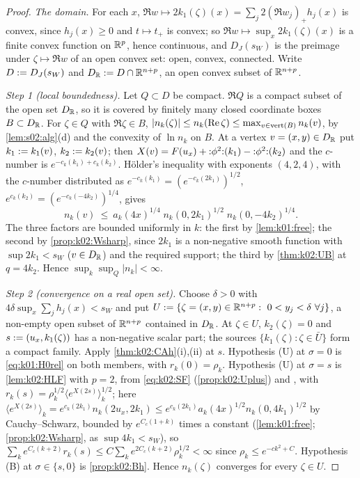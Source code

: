 \begin{proof}
\emph{The domain.} For each $x$, $\Re w\mapsto2k_1(\zeta)(x)=\sum_j2(\Re w_j)_+h_j(x)$ is convex, since $h_j(x)\ge0$ and $t\mapsto t_+$ is convex; so $\Re w\mapsto\sup_x2k_1(\zeta)(x)$ is a finite convex function on $\mathbb R^p$, hence continuous, and $D_J(s_W)$ is the preimage under $\zeta\mapsto\Re w$ of an open convex set: open, convex, connected. Write $D:= D_J(s_W)$ and $D_{\mathbb R}:= D\cap\mathbb R^{n+p}$, an open convex subset of $\mathbb R^{n+p}$.

\emph{Step 1 (local boundedness).} Let $Q\subset D$ be compact. $\Re Q$ is a compact subset of the open set $D_{\mathbb R}$, so it is covered by finitely many closed coordinate boxes $B\subset D_{\mathbb R}$. For $\zeta\in Q$ with $\Re\zeta\in B$, $|n_k(\zeta)|\le n_k(\operatorname{Re}\zeta)\le\max_{v\in\operatorname{vert}(B)}n_k(v)$, by \cref{lem:s02:alg}(d) and the convexity of $\ln n_k$ on $B$. At a vertex $v=(x,y)\in D_{\mathbb R}$ put $k_1:= k_1(v)$, $k_2:= k_2(v)$; then $X(v)=F(u_x)+{:}\phi^2{:}(k_1)-{:}\phi^2{:}(k_2)$ and the $c$-number is $e^{-c_k(k_1)+c_k(k_2)}$. Hölder's inequality with exponents $(4,2,4)$, with the $c$-number distributed as $e^{-c_k(k_1)}=(e^{-c_k(2k_1)})^{1/2}$, $e^{c_k(k_2)}=(e^{-c_k(-4k_2)})^{1/4}$, gives
\[
n_k(v)\ \le\ a_k(4x)^{1/4}\;n_k(0,2k_1)^{1/2}\;n_k(0,-4k_2)^{1/4}.
\]
The three factors are bounded uniformly in $k$: the first by \cref{lem:k01:free}; the second by \cref{prop:k02:Wsharp}, since $2k_1$ is a non-negative smooth function with $\sup2k_1<s_W$ ($v\in D_{\mathbb R}$) and the required support; the third by \cref{thm:k02:UB} at $q=4k_2$. Hence $\sup_k\sup_Q|n_k|<\infty$.

\emph{Step 2 (convergence on a real open set).} Choose $\delta>0$ with $4\delta\sup_x\sum_jh_j(x)<s_W$ and put $U\defeq\{\zeta=(x,y)\in\R^{n+p}:\ 0<y_j<\delta\ \forall j\}$, a non-empty open subset of $\mathbb R^{n+p}$ contained in $D_{\mathbb R}$. At $\zeta\in U$, $k_2(\zeta)=0$ and $s:=(u_x,k_1(\zeta))$ has a non-negative scalar part; the sources $\{k_1(\zeta):\zeta\in\bar U\}$ form a compact family. Apply \cref{thm:k02:CAh}(i),(ii) at $s$. Hypothesis (U) at $\sigma=0$ is \eqref{eq:k01:H0rel} on both members, with $r_k(0)=\rho_k$. Hypothesis (U) at $\sigma=s$ is \cref{lem:k02:HLF} with $p=2$, from \eqref{eq:k02:SF} (\cref{prop:k02:Uplus}) and \Rzero, with $r_k(s)=\rho_k^{1/2}\langle e^{X(2s)}\rangle_k^{1/2}$; here $\langle e^{X(2s)}\rangle_k=e^{c_k(2k_1)}n_k(2u_x,2k_1)\le e^{c_k(2k_1)}a_k(4x)^{1/2}n_k(0,4k_1)^{1/2}$ by Cauchy--Schwarz, bounded by $e^{C_c(1+k)}$ times a constant (\cref{lem:k01:free}; \cref{prop:k02:Wsharp}, as $\sup4k_1<s_W$), so $\sum_ke^{C_c(k+2)}r_k(s)\le C\sum_ke^{2C_c(k+2)}\rho_k^{1/2}<\infty$ since $\rho_k\le e^{-ck^2+C}$. Hypothesis (B) at $\sigma\in\{s,0\}$ is \cref{prop:k02:Bh}. Hence $n_k(\zeta)$ converges for every $\zeta\in U$.


\end{proof}
